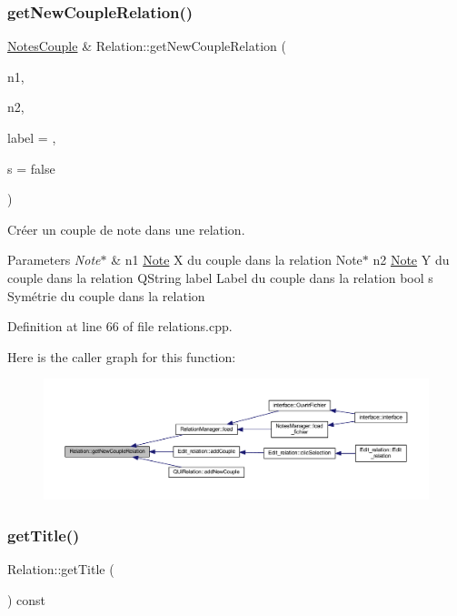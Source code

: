 \subsubsection{\texorpdfstring{get\+New\+Couple\+Relation()}{getNewCoupleRelation()}}
{\footnotesize\ttfamily \hyperlink{class_notes_couple}{Notes\+Couple} \& Relation\+::get\+New\+Couple\+Relation (\begin{DoxyParamCaption}\item[{\hyperlink{class_note}{Note} $\ast$}]{n1,  }\item[{\hyperlink{class_note}{Note} $\ast$}]{n2,  }\item[{Q\+String}]{label = {},  }\item[{bool}]{s = {\ttfamily false} }\end{DoxyParamCaption})}



Créer un couple de note dans une relation. 


\begin{DoxyParams}{Parameters}
{\em Note$\ast$} & n1 \hyperlink{class_note}{Note} X du couple dans la relation Note$\ast$ n2 \hyperlink{class_note}{Note} Y du couple dans la relation Q\+String label Label du couple dans la relation bool s Symétrie du couple dans la relation \\
\hline
\end{DoxyParams}


Definition at line 66 of file relations.\+cpp.

Here is the caller graph for this function\+:
\nopagebreak
\begin{figure}[H]
\begin{center}
\leavevmode
\includegraphics[width=350pt]{class_relation_a69211cc18aed20c1df97c4b73317a2e1_icgraph}
\end{center}
\end{figure}
\mbox{\label{class_relation_aef1db31b9f1a2dc79a1688d4e466e2b1}} 
\subsubsection{\texorpdfstring{get\+Title()}{getTitle()}}
{\footnotesize\ttfamily Relation\+::get\+Title (\begin{DoxyParamCaption}{ }\end{DoxyParamCaption}) const\hspace{0.3cm}{\ttfamily [inline]}}



